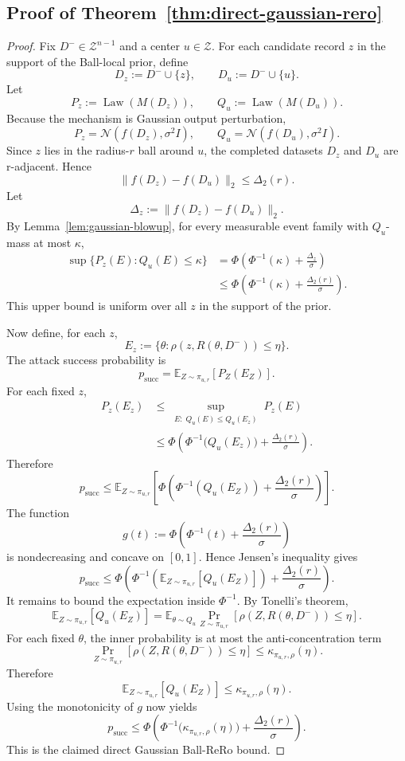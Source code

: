 \documentclass[11pt,a4paper]{report}
\theoremstyle{plain}
\theoremstyle{definition}
\theoremstyle{remark}
\DeclareMathOperator{\Law}{Law}
\begin{document}
\subsection{Proof of Theorem~\ref{thm:direct-gaussian-rero}}

\begin{proof}
Fix $D^-\in\mathcal{Z}^{n-1}$ and a center $u\in\mathcal{Z}$. For each candidate record $z$ in the support of the Ball-local prior, define
\[
D_z:=D^-\cup\{z\},
\qquad
D_u:=D^-\cup\{u\}.
\]
Let
\[
P_z:=\Law(M(D_z)),
\qquad
Q_u:=\Law(M(D_u)).
\]
Because the mechanism is Gaussian output perturbation,
\[
P_z=\mathcal{N}(f(D_z),\sigma^2 I),
\qquad
Q_u=\mathcal{N}(f(D_u),\sigma^2 I).
\]
Since $z$ lies in the radius-$r$ ball around $u$, the completed datasets $D_z$ and $D_u$ are r-adjacent. Hence
\[
\|f(D_z)-f(D_u)\|_2\le \Delta_2(r).
\]
Let
\[
\Delta_z:=\|f(D_z)-f(D_u)\|_2.
\]
By Lemma~\ref{lem:gaussian-blowup}, for every measurable event family
with $Q_u$-mass at most $\kappa$,
\[
\begin{aligned}
\sup\{P_z(E):Q_u(E)\le \kappa\}
&=
\Phi\!\left(
\Phi^{-1}(\kappa)+\frac{\Delta_z}{\sigma}
\right) \\
&\le
\Phi\!\left(
\Phi^{-1}(\kappa)+\frac{\Delta_2(r)}{\sigma}
\right).
\end{aligned}
\]
This upper bound is uniform over all $z$ in the support of the prior.

Now define, for each $z$,
\[
E_z:=\{\theta: \rho(z,R(\theta,D^-))\le \eta\}.
\]
The attack success probability is
\[
p_{\mathrm{succ}}
=
\mathbb{E}_{Z\sim\pi_{u,r}}[P_Z(E_Z)].
\]
For each fixed $z$,
\[
\begin{aligned}
P_z(E_z)
&\le
\sup_{\substack{E:\; Q_u(E)\le Q_u(E_z)}} P_z(E) \\
&\le
\Phi\!\left(
    \Phi^{-1}\!\bigl(Q_u(E_z)\bigr)
    + \frac{\Delta_2(r)}{\sigma}
\right).
\end{aligned}
\]
Therefore
\[
p_{\mathrm{succ}}
\le
\mathbb{E}_{Z\sim\pi_{u,r}}
\left[
\Phi\!\left(\Phi^{-1}(Q_u(E_Z))+\frac{\Delta_2(r)}{\sigma}\right)
\right].
\]
The function
\[
g(t):=\Phi\!\left(\Phi^{-1}(t)+\frac{\Delta_2(r)}{\sigma}\right)
\]
is nondecreasing and concave on $[0,1]$. Hence Jensen's inequality gives
\[
p_{\mathrm{succ}}
\le
\Phi\!\left(
\Phi^{-1}\!\left(\mathbb{E}_{Z\sim\pi_{u,r}}[Q_u(E_Z)]\right)+\frac{\Delta_2(r)}{\sigma}
\right).
\]
It remains to bound the expectation inside $\Phi^{-1}$. By Tonelli's theorem,
\[
\mathbb{E}_{Z\sim\pi_{u,r}}[Q_u(E_Z)]
=
\mathbb{E}_{\theta\sim Q_u}
\Pr_{Z\sim\pi_{u,r}}[\rho(Z,R(\theta,D^-))\le \eta].
\]
For each fixed $\theta$, the inner probability is at most the anti-concentration term
\[
\Pr_{Z\sim\pi_{u,r}}[\rho(Z,R(\theta,D^-))\le \eta]
\le
\kappa_{\pi_{u,r},\rho}(\eta).
\]
Therefore
\[
\mathbb{E}_{Z\sim\pi_{u,r}}[Q_u(E_Z)]
\le
\kappa_{\pi_{u,r},\rho}(\eta).
\]
Using the monotonicity of $g$ now yields
\[
p_{\mathrm{succ}}
\le
\Phi\!\left(
\Phi^{-1}\!\big(\kappa_{\pi_{u,r},\rho}(\eta)\big)+\frac{\Delta_2(r)}{\sigma}
\right).
\]
This is the claimed direct Gaussian Ball-ReRo bound.
\end{proof}
\end{document}
